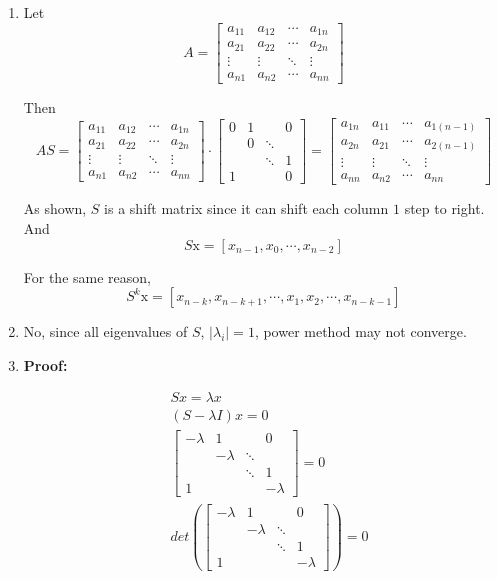 \documentclass[11pt]{article}
\begin{document}
	\begin{enumerate}
		\item Let 
			\[A = \begin{bmatrix}
				a_{11} & a_{12} & \cdots & a_{1n}\\
				a_{21} & a_{22} & \cdots & a_{2n}\\
				\vdots & \vdots & \ddots & \vdots\\
				a_{n1} & a_{n2} & \cdots & a_{nn}
			\end{bmatrix}\]
			
			Then 
			\[AS = \begin{bmatrix}
				a_{11} & a_{12} & \cdots & a_{1n}\\
				a_{21} & a_{22} & \cdots & a_{2n}\\
				\vdots & \vdots & \ddots & \vdots\\
				a_{n1} & a_{n2} & \cdots & a_{nn}
			\end{bmatrix}\cdot\begin{bmatrix}
				0 & 1 & & 0\\
				  & 0 & \ddots & \\
				  &   & \ddots & 1\\
				1 &    &       & 0 
			\end{bmatrix} = \begin{bmatrix}
				a_{1n} & a_{11} & \cdots & a_{1(n - 1)}\\
				a_{2n} & a_{21} & \cdots & a_{2(n - 1)}\\
				\vdots & \vdots & \ddots & \vdots\\
				a_{nn} & a_{n2} & \cdots & a_{nn}
			\end{bmatrix}\]
			
			As shown, $S$ is a shift matrix since it can shift each column $1$ step to right. And 
			\[S\mathrm{x} = [x_{n - 1}, x_0, \cdots, x_{n - 2}]\]
			
			For the same reason, 
			\[S^k\mathrm{x} = [x_{n - k}, x_{n - k + 1}, \cdots, x_1, x_2, \cdots, x_{n - k - 1}]\]
			\item No, since all eigenvalues of $S$, $|\lambda_i| = 1$, power method may not converge.
			\item \textbf{Proof:} 
			
			\begin{align}
				&Sx = \lambda x\nonumber\\
				&(S - \lambda I) x = 0\nonumber\\
				&\begin{bmatrix}
				-\lambda & 1 & & 0\\
				  & -\lambda & \ddots & \\
				  &   & \ddots & 1\\
				1 &    &       & -\lambda
			\end{bmatrix} = 0\nonumber\\
				&det(\begin{bmatrix}
				-\lambda & 1 & & 0\\
				  & -\lambda & \ddots & \\
				  &   & \ddots & 1\\
				1 &    &       & -\lambda
			\end{bmatrix}) = 0\nonumber
			\end{align} 
			

\end{enumerate}
\end{document}
